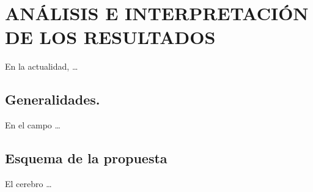 \chapter{ANÁLISIS E INTERPRETACIÓN DE LOS RESULTADOS}
\label{chapter:analisis}

En la actualidad, \ldots


\section{Generalidades.}
\label{section:generalidades}
En el campo \ldots


\section{Esquema de la propuesta}
El cerebro \ldots



